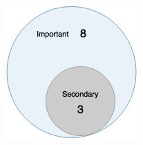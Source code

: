 \\
\begin{figure}[H]
\begin{center}
\includegraphics[scale=0.5]{figures/question1_1}
\label{fig:hybris_architecture/interview/question1-1}
\end{center}
\end{figure}
\\

